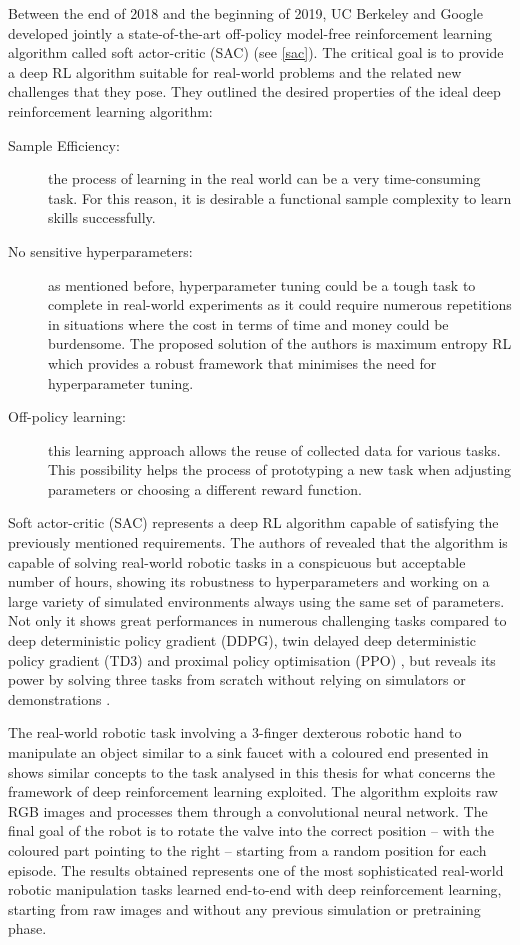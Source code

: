 Between the end of 2018 and the beginning of 2019, UC Berkeley and Google developed jointly a state-of-the-art off-policy model-free reinforcement learning algorithm called soft actor-critic (SAC) (see \vref{sac}). The critical goal is to provide a deep RL algorithm suitable for real-world problems and the related new challenges that they pose.
They outlined the desired properties of the ideal deep reinforcement learning algorithm:
\begin{description}
	\item[Sample Efficiency:] the process of learning in the real world can be a very time-consuming task. For this reason, it is desirable a functional sample complexity to learn skills successfully.
	\item[No sensitive hyperparameters:] as mentioned before, hyperparameter tuning could be a tough task to complete in real-world experiments as it could require numerous repetitions in situations where the cost in terms of time and money could be burdensome. The proposed solution of the authors is maximum entropy RL which provides a robust framework that minimises the need for hyperparameter tuning.
	\item[Off-policy learning:] this learning approach allows the reuse of collected data for various tasks. This possibility helps the process of prototyping a new task when adjusting parameters or choosing a different reward function.
\end{description}

Soft actor-critic (SAC) represents a deep RL algorithm capable of satisfying the previously mentioned requirements. The authors of \cite{haarnoja2018soft,haarnoja2018alg} revealed that the algorithm is capable of solving real-world robotic tasks in a conspicuous but acceptable number of hours, showing its robustness to hyperparameters and working on a large variety of simulated environments always using the same set of parameters.
Not only it shows great performances in numerous challenging tasks compared to deep deterministic policy gradient (DDPG), twin delayed deep deterministic policy gradient (TD3) \cite{fujimoto2018addressing} and proximal policy optimisation (PPO) \cite{schulman2017proximal}, but reveals its power by solving three tasks from scratch without relying on simulators or demonstrations \cite{bair2019soft}.

The real-world robotic task involving a 3-finger dexterous robotic hand to manipulate an object similar to a sink faucet with a coloured end presented in \cite[Section 7.3]{haarnoja2018alg} shows similar concepts to the task analysed in this thesis for what concerns the framework of deep reinforcement learning exploited. The algorithm exploits raw RGB images and processes them through a convolutional neural network. The final goal of the robot is to rotate the valve into the correct position -- with the coloured part pointing to the right -- starting from a random position for each episode. The results obtained represents one of the most sophisticated real-world robotic manipulation tasks learned end-to-end with deep reinforcement learning, starting from raw images and without any previous simulation or pretraining phase.

